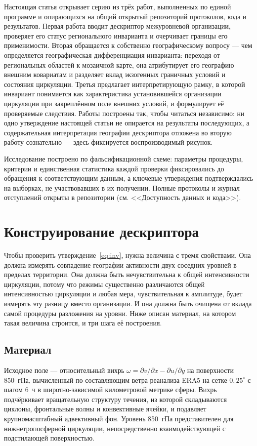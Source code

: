 \documentclass[11pt,a4paper]{article}
\begin{document}
Настоящая статья открывает серию из трёх работ, выполненных по единой программе и опирающихся на общий открытый репозиторий протоколов, кода и результатов. Первая работа вводит дескриптор межуровневой организации, проверяет его статус регионального инварианта и очерчивает границы его применимости. Вторая обращается к собственно географическому вопросу --- чем определяется географическая дифференциация инварианта: переходя от региональных областей к мозаичной карте, она атрибутирует его географию внешним ковариатам и разделяет вклад экзогенных граничных условий и состояния циркуляции. Третья предлагает интерпретирующую рамку, в которой инвариант понимается как характеристика установившейся организации циркуляции при закреплённом поле внешних условий, и формулирует её проверяемые следствия. Работы построены так, чтобы читаться независимо: ни одно утверждение настоящей статьи не опирается на результаты последующих, а содержательная интерпретация географии дескриптора отложена во вторую работу сознательно --- здесь фиксируется воспроизводимый рисунок.

Исследование построено по фальсификационной схеме: параметры процедуры, критерии и единственная статистика каждой проверки фиксировались до обращения к соответствующим данным, а ключевые утверждения подтверждались на выборках, не участвовавших в их получении. Полные протоколы и журнал отступлений открыты в репозитории (см. <<Доступность данных и кода>>).

\section{Конструирование дескриптора}
\label{sec:construct}

Чтобы проверить утверждение~\eqref{eq:inv}, нужна величина с тремя свойствами. Она должна измерять совпадение географии активности двух соседних уровней в пределах территории. Она должна быть нечувствительна к общей интенсивности циркуляции, потому что режимы существенно различаются общей интенсивностью циркуляции и любая мера, чувствительная к амплитуде, будет измерять эту разницу вместо организации. И она должна быть очищена от вклада самой процедуры разложения на уровни. Ниже описан материал, на котором такая величина строится, и три шага её построения.

\subsection{Материал}

Исходное поле --- относительный вихрь $\omega=\partial v/\partial x-\partial u/\partial y$ на поверхности 850~гПа, вычисленный по составляющим ветра реанализа ERA5 \cite{Hersbach2020,Soci2024} на сетке $0{,}25^\circ$ с шагом 6~ч в широтно-зависимой километровой метрике сферы. Вихрь подчёркивает вращательную структуру течения, из которой складываются циклоны, фронтальные волны и конвективные ячейки, и подавляет крупномасштабный адвективный фон. Уровень 850~гПа представителен для нижнетропосферной циркуляции, непосредственно взаимодействующей с подстилающей поверхностью.
\end{document}
